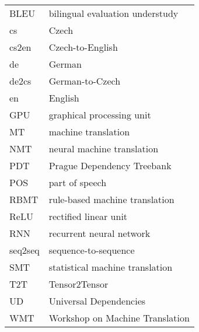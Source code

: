 \documentclass[12pt,a4paper]{report}
\begin{document}



\tableofcontents













\listoffigures

\listoftables


\begin{table}[h]
    \begin{tabular}{p{2cm}l}
        BLEU & bilingual evaluation understudy \\
        cs & Czech \\
        cs2en & Czech-to-English \\
        de & German \\
        de2cs & German-to-Czech \\
        en & English \\
        GPU & graphical processing unit \\
        MT & machine translation \\
        NMT & neural machine translation \\
        PDT & Prague Dependency Treebank \\
        POS & part of speech \\
        RBMT & rule-based machine translation \\
        ReLU & rectified linear unit \\
        RNN & recurrent neural network \\
        seq2seq & sequence-to-sequence \\
        SMT & statistical machine translation \\
        T2T & Tensor2Tensor \\
        UD & Universal Dependencies \\
        WMT & Workshop on Machine Translation \\
    \end{tabular}
\end{table}
\end{document}
